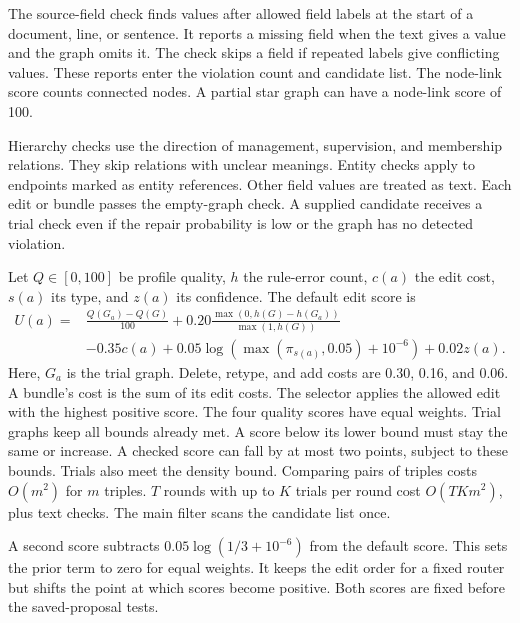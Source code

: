 The source-field check finds values after allowed field labels at the
start of a document, line, or sentence. It reports a missing field when
the text gives a value and the graph omits it. The check skips a field if
repeated labels give conflicting values. These reports enter the violation
count and candidate list. The node-link score counts connected nodes.
A partial star graph can have a node-link score of 100.

Hierarchy checks use the direction of management, supervision, and membership
relations. They skip relations with unclear meanings. Entity checks apply
to endpoints marked as entity references. Other field values are treated
as text. Each edit or bundle passes the empty-graph check.
A supplied candidate receives a trial check even if the repair probability
is low or the graph has no detected violation.

Let $Q\in[0,100]$ be profile quality, $h$ the rule-error count, $c(a)$
the edit cost, $s(a)$ its type, and $z(a)$ its confidence.
The default edit score is
\begin{equation}
\begin{split}
U(a)={}&\frac{Q(G_a)-Q(G)}{100}
+0.20\frac{\max(0,h(G)-h(G_a))}{\max(1,h(G))}\\
&-0.35c(a)+0.05\log\!\left(\max(\pi_{s(a)},0.05)+10^{-6}\right)
+0.02z(a).
\end{split}
\end{equation}
Here, $G_a$ is the trial graph. Delete, retype, and add costs are 0.30,
0.16, and 0.06. A bundle's cost is the sum of its edit costs.
The selector applies the allowed edit with the highest positive score.
The four quality scores have equal weights.
Trial graphs keep all bounds already met. A score below its lower bound
must stay the same or increase. A checked score can fall by at most two
points, subject to these bounds. Trials also meet the density bound.
Comparing pairs of triples costs $O(m^2)$ for $m$ triples.
$T$ rounds with up to $K$ trials per round cost $O(TKm^2)$, plus text checks.
The main filter scans the candidate list once.

A second score subtracts $0.05\log(1/3+10^{-6})$ from the default score.
This sets the prior term to zero for equal weights. It keeps the edit order
for a fixed router but shifts the point at which scores become positive.
Both scores are fixed before the saved-proposal tests.
